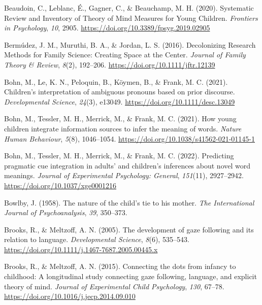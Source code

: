 \documentclass[
]{scrbook}
\newlength{\cslhangindent}
\newenvironment{CSLReferences}[2] %
 {\begin{list}{}{%
  \setlength{\itemindent}{0pt}
  \setlength{\leftmargin}{0pt}
  \setlength{\parsep}{0pt}
  \ifodd #1
   \setlength{\leftmargin}{\cslhangindent}
   \setlength{\itemindent}{-1\cslhangindent}
  \fi
  \setlength{\itemsep}{#2\baselineskip}}}
 {\end{list}}
\begin{document}
\begin{CSLReferences}{1}{0}
Beaudoin, C., Leblanc, É., Gagner, C., \& Beauchamp, M. H. (2020). Systematic {Review} and {Inventory} of {Theory} of {Mind Measures} for {Young Children}. \emph{Frontiers in Psychology}, \emph{10}, 2905. \url{https://doi.org/10.3389/fpsyg.2019.02905}

Bermúdez, J. M., Muruthi, B. A., \& Jordan, L. S. (2016). Decolonizing {Research Methods} for {Family Science}: {Creating Space} at the {Center}. \emph{Journal of Family Theory \& Review}, \emph{8}(2), 192--206. \url{https://doi.org/10.1111/jftr.12139}

Bohn, M., Le, K. N., Peloquin, B., Köymen, B., \& Frank, M. C. (2021). Children's interpretation of ambiguous pronouns based on prior discourse. \emph{Developmental Science}, \emph{24}(3), e13049. \url{https://doi.org/10.1111/desc.13049}

Bohn, M., Tessler, M. H., Merrick, M., \& Frank, M. C. (2021). How young children integrate information sources to infer the meaning of words. \emph{Nature Human Behaviour}, \emph{5}(8), 1046--1054. \url{https://doi.org/10.1038/s41562-021-01145-1}

Bohn, M., Tessler, M. H., Merrick, M., \& Frank, M. C. (2022). Predicting pragmatic cue integration in adults' and children's inferences about novel word meanings. \emph{Journal of Experimental Psychology: General}, \emph{151}(11), 2927--2942. \url{https://doi.org/10.1037/xge0001216}

Bowlby, J. (1958). The nature of the child's tie to his mother. \emph{The International Journal of Psychoanalysis}, \emph{39}, 350--373.

Brooks, R., \& Meltzoff, A. N. (2005). The development of gaze following and its relation to language. \emph{Developmental Science}, \emph{8}(6), 535--543. \url{https://doi.org/10.1111/j.1467-7687.2005.00445.x}

Brooks, R., \& Meltzoff, A. N. (2015). Connecting the dots from infancy to childhood: {A} longitudinal study connecting gaze following, language, and explicit theory of mind. \emph{Journal of Experimental Child Psychology}, \emph{130}, 67--78. \url{https://doi.org/10.1016/j.jecp.2014.09.010}


\end{CSLReferences}
\end{document}
